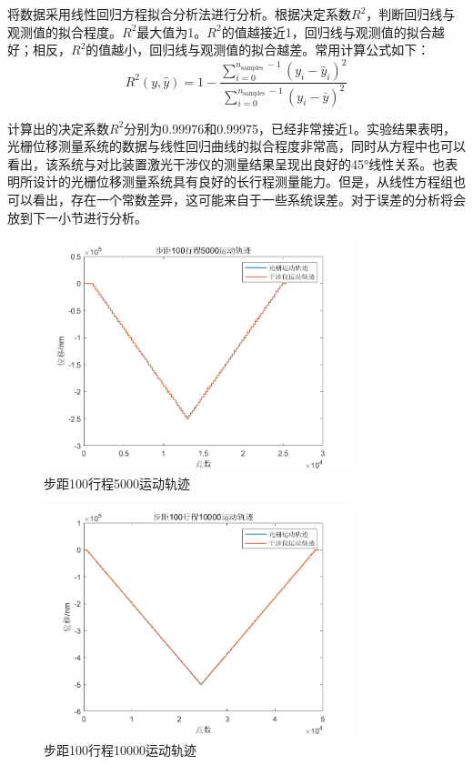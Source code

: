 \documentclass[type=master,oneside]{fduthesis}
\begin{document}
将数据采用线性回归方程拟合分析法进行分析。根据决定系数$R^{2}$，判断回归线与观测值的拟合程度。$R^{2}$最大值为1。$R^{2}$的值越接近1，回归线与观测值的拟合越好；相反，$R^{2}$的值越小，回归线与观测值的拟合越差。常用计算公式如下：
\begin{equation}
  R^{2}(y, \hat{y})=1-\frac{\sum_{i=0}^{n_{\text {samples }}-1}\left(y_{i}-\hat{y}_{i}\right)^{2}}{\sum_{i=0}^{n_{\text {samples }}-1}\left(y_{i}-\bar{y}\right)^{2}}
\end{equation}

计算出的决定系数$R^{2}$分别为0.99976和0.99975，已经非常接近1。实验结果表明，光栅位移测量系统的数据与线性回归曲线的拟合程度非常高，同时从方程中也可以看出，该系统与对比装置激光干涉仪的测量结果呈现出良好的45°线性关系。也表明所设计的光栅位移测量系统具有良好的长行程测量能力。但是，从线性方程组也可以看出，存在一个常数差异，这可能来自于一些系统误差。对于误差的分析将会放到下一小节进行分析。

\begin{figure}[H]
  \centering
  \includegraphics[width=0.8\textwidth]{4-fig//步距100行程5000运动轨迹.png}
  \caption{步距100行程5000运动轨迹}
  \label{fig:步距100行程5000运动轨迹}
\end{figure}

\begin{figure}[H]
  \centering
  \includegraphics[width=0.8\textwidth]{4-fig//步距100行程10000运动轨迹.png}
  \caption{步距100行程10000运动轨迹}
  \label{fig:步距100行程10000运动轨迹}
\end{figure}
\end{document}
